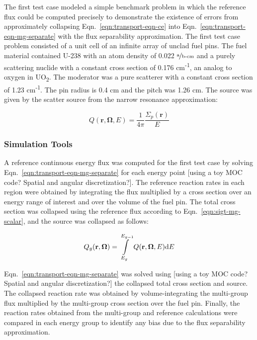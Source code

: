 The first test case modeled a simple benchmark problem in which the reference flux could be computed precisely to demonstrate the existence of errors from approximately collapsing Eqn.~\ref{eqn:transport-eqn-ce} into Eqn.~\ref{eqn:transport-eqn-mg-separate} with the flux separability approximation. The first test case problem consisted of a unit cell of an infinite array of unclad fuel pins. The fuel material contained U-238 with an atom density of 0.022 $\nicefrac{\text{a}}{\text{b-cm}}$ and a purely scattering nuclide with a constant cross section of 0.176 cm\textsuperscript{-1}, an analog to oxygen in UO\textsubscript{2}. The moderator was a pure scatterer with a constant cross section of 1.23 cm\textsuperscript{-1}. The pin radius is 0.4 cm and the pitch was 1.26 cm. The source was given by the scatter source from the narrow resonance approximation:

\begin{dmath}
\label{eqn:test-source-ce}
Q(\mathbf{r},\mathbf{\Omega},E) = \frac{1}{4\pi} \frac{\Sigma_{p}(\mathbf{r})}{E}
\end{dmath}


\subsubsection{Simulation Tools}
\label{subsubsec:sim-tools-case1}

A reference continuous energy flux was computed for the first test case by solving Eqn.~\ref{eqn:transport-eqn-mg-separate} for each energy point {\color{red}[using a toy MOC code? Spatial and angular discretization?]}. The reference reaction rates in each region were obtained by integrating the flux multiplied by a cross section over an energy range of interest and over the volume of the fuel pin. The total cross section was collapsed using the reference flux according to Eqn.~\ref{eqn:sigt-mg-scalar}, and the source was collapsed as follows:

\begin{dmath}
\label{eqn:test1-source-mg}
Q_{g}(\mathbf{r},\mathbf{\Omega}) = \int\displaylimits_{E_{g}}^{E_{g-1}} Q(\mathbf{r},\mathbf{\Omega},E)\mathrm{d}E
\end{dmath}

Eqn.~\ref{eqn:transport-eqn-mg-separate} was solved using {\color{red}[using a toy MOC code? Spatial and angular discretization?]} the collapsed total cross section and source. The collapsed reaction rate was obtained by volume-integrating the multi-group flux multiplied by the multi-group cross section over the fuel pin. Finally, the reaction rates obtained from the multi-group and reference calculations were compared in each energy group to identify any bias due to the flux separability approximation.


